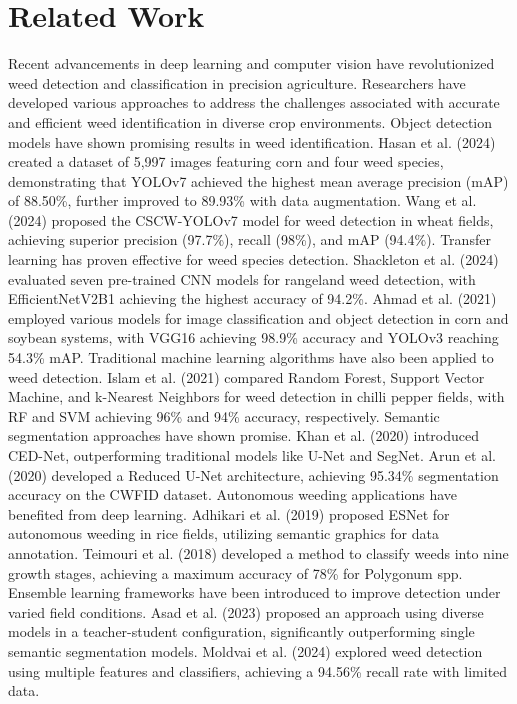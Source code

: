 \section{Related Work}

Recent advancements in deep learning and computer vision have revolutionized weed detection and classification in precision agriculture. Researchers have developed various approaches to address the challenges associated with accurate and efficient weed identification in diverse crop environments.
Object detection models have shown promising results in weed identification. Hasan et al. (2024) \cite{Hasan2024-su} created a dataset of 5,997 images featuring corn and four weed species, demonstrating that YOLOv7 achieved the highest mean average precision (mAP) of 88.50\%, further improved to 89.93\% with data augmentation. Wang et al. (2024) \cite{Wang2024-tt} proposed the CSCW-YOLOv7 model for weed detection in wheat fields, achieving superior precision (97.7\%), recall (98\%), and mAP (94.4\%).
Transfer learning has proven effective for weed species detection. Shackleton et al. (2024) \cite{Shackleton2024-uc} evaluated seven pre-trained CNN models for rangeland weed detection, with EfficientNetV2B1 achieving the highest accuracy of 94.2\%. Ahmad et al. (2021) \cite{Ahmad2021-gs} employed various models for image classification and object detection in corn and soybean systems, with VGG16 achieving 98.9\% accuracy and YOLOv3 reaching 54.3\% mAP.
Traditional machine learning algorithms have also been applied to weed detection. Islam et al. (2021) \cite{Islam2021-iy} compared Random Forest, Support Vector Machine, and k-Nearest Neighbors for weed detection in chilli pepper fields, with RF and SVM achieving 96\% and 94\% accuracy, respectively.
Semantic segmentation approaches have shown promise. Khan et al. (2020) \cite{Khan2020-xb} introduced CED-Net, outperforming traditional models like U-Net and SegNet. Arun et al. (2020) \cite{Arun2020-eu} developed a Reduced U-Net architecture, achieving 95.34\% segmentation accuracy on the CWFID dataset.
Autonomous weeding applications have benefited from deep learning. Adhikari et al. (2019) \cite{Adhikari2019-os} proposed ESNet for autonomous weeding in rice fields, utilizing semantic graphics for data annotation. Teimouri et al. (2018) \cite{Teimouri2018-mx} developed a method to classify weeds into nine growth stages, achieving a maximum accuracy of 78\% for Polygonum spp.
Ensemble learning frameworks have been introduced to improve detection under varied field conditions. Asad et al. (2023) \cite{Asad2023-zv} proposed an approach using diverse models in a teacher-student configuration, significantly outperforming single semantic segmentation models. Moldvai et al. (2024) \cite{Moldvai2024-hb} explored weed detection using multiple features and classifiers, achieving a 94.56\% recall rate with limited data.
